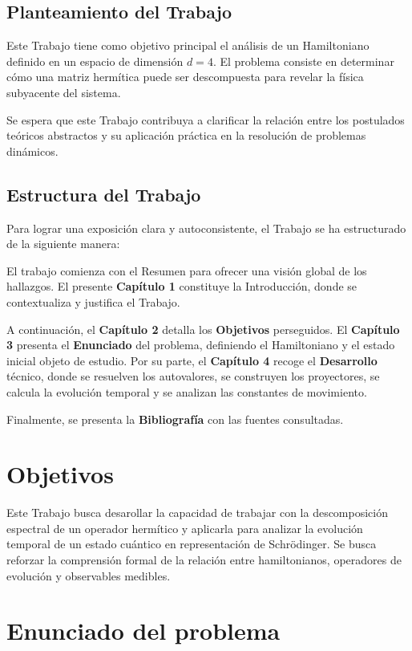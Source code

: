 \documentclass[11pt,a4paper,spanish]{book}
\begin{document}
\section{Planteamiento del Trabajo}

Este Trabajo tiene como objetivo principal el análisis de un Hamiltoniano definido en un espacio de dimensión $d=4$. El problema consiste en determinar cómo una matriz hermítica puede ser descompuesta para revelar la física subyacente del sistema.

Se espera que este Trabajo contribuya a clarificar la relación entre los postulados teóricos abstractos y su aplicación práctica en la resolución de problemas dinámicos.


\section{Estructura del Trabajo}

Para lograr una exposición clara y autoconsistente, el Trabajo se ha estructurado de la siguiente manera:

El trabajo comienza con el Resumen para ofrecer una visión global de los hallazgos. El presente \textbf{Capítulo 1} constituye la Introducción, donde se contextualiza y justifica el Trabajo.

A continuación, el \textbf{Capítulo 2} detalla los \textbf{Objetivos} perseguidos. El \textbf{Capítulo 3} presenta el \textbf{Enunciado} del problema, definiendo el Hamiltoniano y el estado inicial objeto de estudio. Por su parte, el \textbf{Capítulo 4} recoge el \textbf{Desarrollo} técnico, donde se resuelven los autovalores, se construyen los proyectores, se calcula la evolución temporal y se analizan las constantes de movimiento.

Finalmente, se presenta la \textbf{Bibliografía} con las fuentes consultadas.


\chapter{Objetivos}
Este Trabajo busca desarollar la capacidad de trabajar con la descomposición espectral de un operador hermítico y aplicarla para analizar la evolución temporal de un estado cuántico en representación de Schrödinger. Se busca reforzar la comprensión formal de la relación entre hamiltonianos, operadores de evolución y observables medibles.

\chapter{Enunciado del problema}
\end{document}
